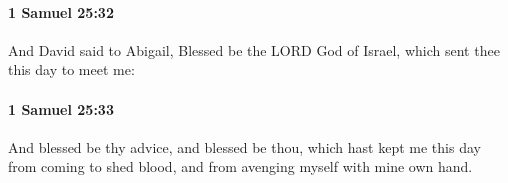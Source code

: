 		\paragraph{1 Samuel 25:32} %
			\label{1SAMUEL-25-32}

			And David said to Abigail, Blessed be the LORD God of Israel, which sent thee this day to meet me:


		\paragraph{1 Samuel 25:33} %
			\label{1SAMUEL-25-33}

			And blessed be thy advice, and blessed be thou, which hast kept me this day from coming to shed blood, and from avenging myself with mine own hand.


